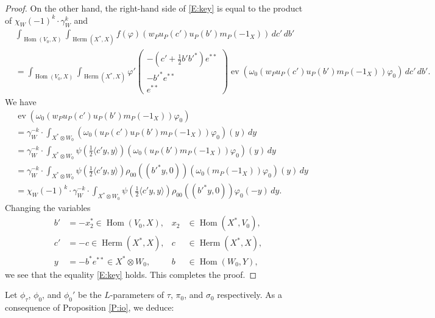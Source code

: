 \documentclass[11pt]{amsart}
\numberwithin{equation}{section}
\theoremstyle{plain}
\theoremstyle{definition}
\theoremstyle{remark}
\def\ev{\operatorname{ev}}
\def\Herm{\operatorname{Herm}}
\def\Hom{\operatorname{Hom}}
\begin{document}
\begin{proof}
On the other hand, the right-hand side of \eqref{E:key} is equal to the product of $\chi_W(-1)^k \cdot \gamma_{W}^k$ and 
\begin{align*}
 & \int_{\Hom(V_0, X)} \int_{\Herm(X^*,X)}
 f(\varphi)(w_P u_P(c') u_P(b') m_P(-1_X)) \, dc' \, db' \\
 & = \int_{\Hom(V_0, X)} \int_{\Herm(X^*,X)} \varphi'
 \begin{pmatrix}
  -(c' + \frac{1}{2}b' b'^*) e^{**} \\
  -b'^* e^{**} \\
  e^{**}
 \end{pmatrix}
 \ev(\omega_0(w_P u_P(c') u_P(b') m_P(-1_X)) \varphi_0) \, dc' \, db'.
\end{align*}
We have
\begin{align*}
 &  \ev(\omega_0(w_P u_P(c') u_P(b') m_P(-1_X)) \varphi_0) \\
 & = \gamma_{W}^{-k} \cdot \int_{X^* \otimes W_0} (\omega_0(u_P(c') u_P(b') m_P(-1_X)) \varphi_0)(y) \, dy \\
 & = \gamma_{W}^{-k} \cdot \int_{X^* \otimes W_0} \psi(\tfrac{1}{2} \langle c'y, y \rangle) 
 (\omega_0(u_P(b') m_P(-1_X)) \varphi_0)(y) \, dy \\
 & = \gamma_{W}^{-k} \cdot \int_{X^* \otimes W_0} \psi(\tfrac{1}{2} \langle c'y, y \rangle)
 \rho_{00}((b'^*y,0)) (\omega_0(m_P(-1_X)) \varphi_0)(y) \, dy \\
 & = \chi_W(-1)^k \cdot \gamma_{W}^{-k} \cdot \int_{X^* \otimes W_0}
 \psi(\tfrac{1}{2} \langle c'y, y \rangle)
 \rho_{00}((b'^*y,0)) \varphi_0(-y) \, dy.
\end{align*}
Changing the variables
\begin{align*}
 b' & = -x_2^* \in \Hom(V_0, X), & x_2 & \in \Hom(X^*, V_0), \\
 c' & = -c \in \Herm(X^*,X), & c & \in \Herm(X^*,X), \\
 y & = - b^* e^{**} \in X^* \otimes W_0, & b & \in \Hom(W_0, Y),
\end{align*}
we see that the equality \eqref{E:key} holds.
This completes the proof.
\end{proof}

Let $\phi_{\tau}$, $\phi_0$, and $\phi_0'$ be the $L$-parameters of $\tau$, $\pi_0$, and $\sigma_0$ respectively.
As a consequence of Proposition \ref{P:io}, we deduce:
\end{document}
